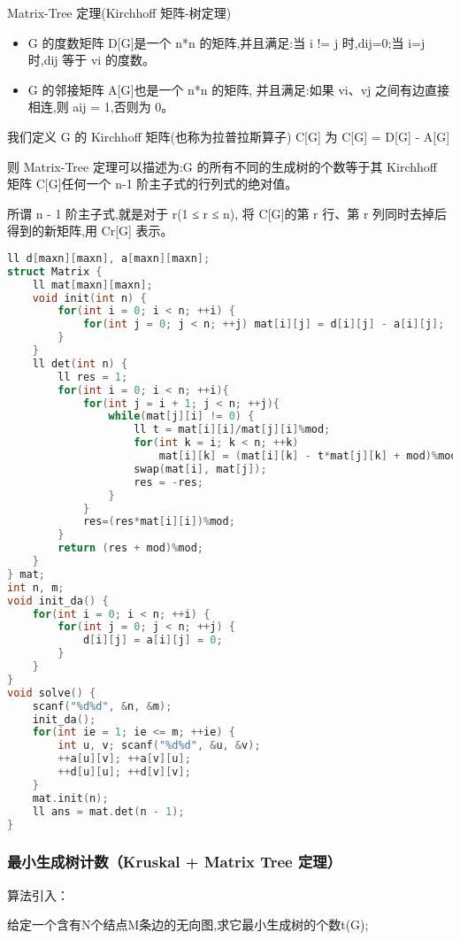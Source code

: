 Matrix-Tree 定理(Kirchhoff 矩阵-树定理)

\begin{itemize}
    \item G 的度数矩阵 D[G]是一个 n*n 的矩阵,并且满足:当 i != j 时,dij=0;当 i=j 时,dij 等于 vi 的度数。
    \item G 的邻接矩阵 A[G]也是一个 n*n 的矩阵, 并且满足:如果 vi、vj 之间有边直接相连,则 aij = 1,否则为 0。
\end{itemize}

我们定义 G 的 Kirchhoff 矩阵(也称为拉普拉斯算子) C[G] 为 C[G] = D[G] - A[G]

则 Matrix-Tree 定理可以描述为:G 的所有不同的生成树的个数等于其 Kirchhoff 矩阵 C[G]任何一个 n-1 阶主子式的行列式的绝对值。

所谓 n - 1 阶主子式,就是对于 r(1 ≤ r ≤ n), 将 C[G]的第 r 行、第 r 列同时去掉后得到的新矩阵,用 Cr[G] 表示。

\begin{lstlisting}[language=C++]
ll d[maxn][maxn], a[maxn][maxn];
struct Matrix {
    ll mat[maxn][maxn];
    void init(int n) {
        for(int i = 0; i < n; ++i) {
            for(int j = 0; j < n; ++j) mat[i][j] = d[i][j] - a[i][j];
        }
    }
    ll det(int n) {
        ll res = 1;
        for(int i = 0; i < n; ++i){
            for(int j = i + 1; j < n; ++j){
                while(mat[j][i] != 0) {
                    ll t = mat[i][i]/mat[j][i]%mod;
                    for(int k = i; k < n; ++k)
                        mat[i][k] = (mat[i][k] - t*mat[j][k] + mod)%mod;
                    swap(mat[i], mat[j]);
                    res = -res;
                }
            }
            res=(res*mat[i][i])%mod;
        }
        return (res + mod)%mod;
    }
} mat;
int n, m;
void init_da() {
    for(int i = 0; i < n; ++i) {
        for(int j = 0; j < n; ++j) {
            d[i][j] = a[i][j] = 0;
        }
    }
}
void solve() {
    scanf("%d%d", &n, &m);
    init_da();
    for(int ie = 1; ie <= m; ++ie) {
        int u, v; scanf("%d%d", &u, &v);
        ++a[u][v]; ++a[v][u];
        ++d[u][u]; ++d[v][v];
    }
    mat.init(n);
    ll ans = mat.det(n - 1);
}
\end{lstlisting}

\subsubsection{最小生成树计数（Kruskal + Matrix Tree 定理）}

算法引入：

给定一个含有N个结点M条边的无向图,求它最小生成树的个数t(G);

